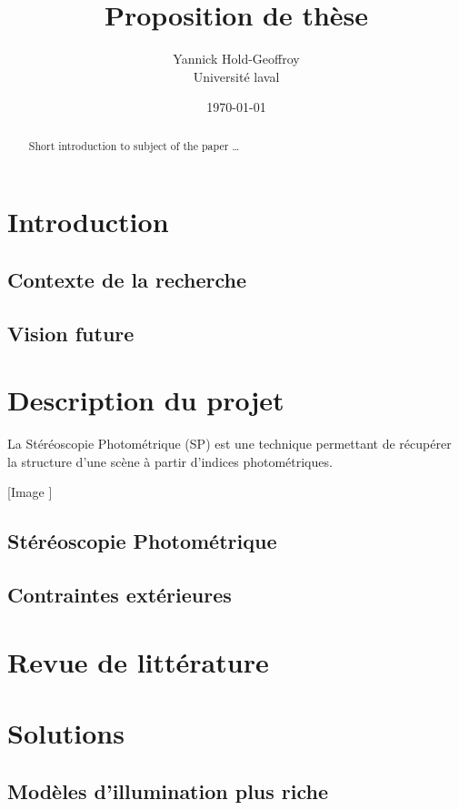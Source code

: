 \documentclass{report}
\title{Proposition de th\`ese}
\author{Yannick Hold-Geoffroy  \\
    Universit\'e laval  \\
    }
\date{\today}
\begin{document}
\maketitle


\begin{abstract}
Short introduction to subject of the paper \ldots 
\end{abstract}

\section{Introduction}

\subsection{Contexte de la recherche}


\subsection{Vision future}


\section{Description du projet}

La Stéréoscopie Photométrique (SP) est une technique permettant de récupérer la structure d'une scène à partir d'indices photométriques.

[Image ]

\subsection{Stéréoscopie Photométrique}

\subsection{Contraintes extérieures}


\section{Revue de littérature}

\cite{Hold-Geoffroy-3DV15,Hold-Geoffroy-ICCP15}


\section{Solutions}

\subsection{Modèles d'illumination plus riche}
\end{document}
